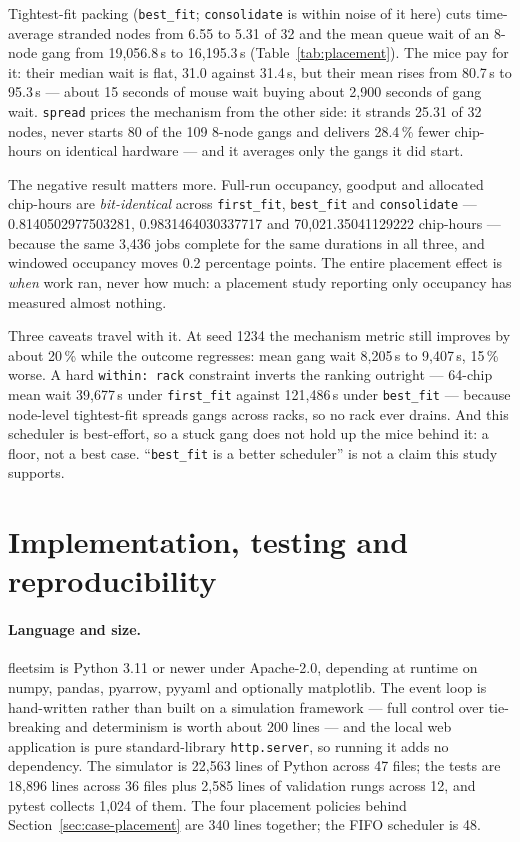 Tightest-fit packing (\texttt{best\_fit}; \texttt{consolidate} is within noise
of it here) cuts time-average stranded nodes from 6.55 to 5.31 of 32
and the mean queue wait of an 8-node gang from 19,056.8\,s to 16,195.3\,s
(Table~\ref{tab:placement}). The mice pay for it: their median wait is flat,
31.0 against 31.4\,s, but their mean rises from 80.7\,s to 95.3\,s --- about
15 seconds of mouse wait buying about 2,900 seconds of gang wait.
\texttt{spread} prices the mechanism from the other side: it strands 25.31 of
32 nodes, never starts 80 of the 109 8-node gangs and delivers 28.4\,\% fewer
chip-hours on identical hardware --- and it averages only the gangs it did
start.

The negative result matters more. Full-run occupancy, goodput and allocated
chip-hours are \emph{bit-identical} across \texttt{first\_fit},
\texttt{best\_fit} and \texttt{consolidate} --- 0.8140502977503281,
0.9831464030337717 and 70,021.35041129222 chip-hours --- because the same
3,436 jobs complete for the same durations in all three, and windowed
occupancy moves 0.2 percentage points. The entire placement effect is
\emph{when} work ran, never how much: a placement study reporting only
occupancy has measured almost nothing.

Three caveats travel with it. At seed 1234 the mechanism metric still improves
by about 20\,\% while the outcome regresses: mean gang wait 8,205\,s to
9,407\,s, 15\,\% worse. A hard \texttt{within: rack} constraint inverts the
ranking outright --- 64-chip mean wait 39,677\,s under \texttt{first\_fit}
against 121,486\,s under \texttt{best\_fit} --- because node-level
tightest-fit spreads gangs across racks, so no rack ever drains. And this
scheduler is best-effort, so a stuck gang does not hold up the mice behind it:
a floor, not a best case. ``\texttt{best\_fit} is a better scheduler'' is not
a claim this study supports.

\section{Implementation, testing and reproducibility}\label{sec:impl}

\paragraph{Language and size.} fleetsim is Python 3.11 or newer under
Apache-2.0, depending at runtime on numpy, pandas, pyarrow, pyyaml and
optionally matplotlib. The event loop is hand-written rather than built on a
simulation framework --- full control over tie-breaking and determinism is
worth about 200 lines --- and the local web application is pure
standard-library \texttt{http.server}, so running it adds no dependency. The
simulator is 22,563 lines of Python across 47 files; the tests are 18,896
lines across 36 files plus 2,585 lines of validation rungs across 12, and
pytest collects 1,024 of them. The four placement policies behind
Section~\ref{sec:case-placement} are 340 lines together; the FIFO scheduler is
48.

